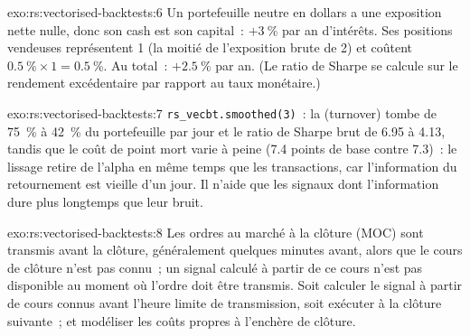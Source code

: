 \begin{solution}{exo:rs:vectorised-backtests:6}
Un portefeuille neutre en dollars a une exposition nette nulle, donc son cash est son capital~: $+3~\%$ par an d'intérêts. Ses positions vendeuses représentent 1 (la moitié de l'exposition brute de 2) et coûtent $0.5~\% \times 1
= 0.5~\%$. Au total~: $+2.5~\%$ par an. (Le ratio de Sharpe se calcule sur le rendement excédentaire par rapport au taux monétaire.)
\end{solution}

\begin{solution}{exo:rs:vectorised-backtests:7}
\texttt{rs\_vecbt.smoothed(3)}~: la  (turnover) tombe de 75~\% à 42~\% du portefeuille par jour et le ratio de Sharpe brut de 6.95 à 4.13, tandis que le coût de point mort
varie à peine (7.4 points de base contre 7.3)~: le lissage retire de l'alpha en même temps que les transactions, car l'information du retournement est vieille d'un jour. Il n'aide
que les signaux dont l'information dure plus longtemps que leur bruit.
\end{solution}

\begin{solution}{exo:rs:vectorised-backtests:8}
Les ordres au marché à la clôture (MOC) sont transmis avant la clôture, généralement quelques minutes avant, alors que le cours de clôture n'est pas connu~; un signal calculé à partir de ce cours n'est
pas disponible au moment où l'ordre doit être transmis. Soit calculer le signal à partir de cours connus avant l'heure limite de transmission, soit exécuter à la clôture suivante~; et modéliser
les coûts propres à l'enchère de clôture.
\end{solution}

